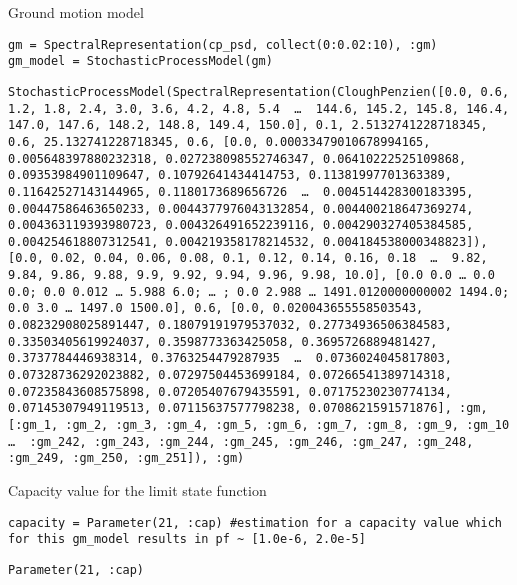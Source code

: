Ground motion model




\begin{verbatim}
gm = SpectralRepresentation(cp_psd, collect(0:0.02:10), :gm)
gm_model = StochasticProcessModel(gm)
\end{verbatim}


\begin{verbatim}
StochasticProcessModel(SpectralRepresentation(CloughPenzien([0.0, 0.6, 1.2, 1.8, 2.4, 3.0, 3.6, 4.2, 4.8, 5.4  …  144.6, 145.2, 145.8, 146.4, 147.0, 147.6, 148.2, 148.8, 149.4, 150.0], 0.1, 2.5132741228718345, 0.6, 25.132741228718345, 0.6, [0.0, 0.00033479010678994165, 0.005648397880232318, 0.027238098552746347, 0.06410222525109868, 0.09353984901109647, 0.10792641434414753, 0.11381997701363389, 0.11642527143144965, 0.1180173689656726  …  0.004514428300183395, 0.00447586463650233, 0.0044377976043132854, 0.004400218647369274, 0.004363119393980723, 0.004326491652239116, 0.004290327405384585, 0.004254618807312541, 0.004219358178214532, 0.004184538000348823]), [0.0, 0.02, 0.04, 0.06, 0.08, 0.1, 0.12, 0.14, 0.16, 0.18  …  9.82, 9.84, 9.86, 9.88, 9.9, 9.92, 9.94, 9.96, 9.98, 10.0], [0.0 0.0 … 0.0 0.0; 0.0 0.012 … 5.988 6.0; … ; 0.0 2.988 … 1491.0120000000002 1494.0; 0.0 3.0 … 1497.0 1500.0], 0.6, [0.0, 0.020043655558503543, 0.08232908025891447, 0.18079191979537032, 0.27734936506384583, 0.33503405619924037, 0.3598773363425058, 0.3695726889481427, 0.3737784446938314, 0.3763254479287935  …  0.0736024045817803, 0.07328736292023882, 0.07297504453699184, 0.07266541389714318, 0.07235843608575898, 0.07205407679435591, 0.07175230230774134, 0.07145307949119513, 0.07115637577798238, 0.0708621591571876], :gm, [:gm_1, :gm_2, :gm_3, :gm_4, :gm_5, :gm_6, :gm_7, :gm_8, :gm_9, :gm_10  …  :gm_242, :gm_243, :gm_244, :gm_245, :gm_246, :gm_247, :gm_248, :gm_249, :gm_250, :gm_251]), :gm)
\end{verbatim}



Capacity value for the limit state function




\begin{verbatim}
capacity = Parameter(21, :cap) #estimation for a capacity value which for this gm_model results in pf ~ [1.0e-6, 2.0e-5]
\end{verbatim}


\begin{verbatim}
Parameter(21, :cap)
\end{verbatim}



